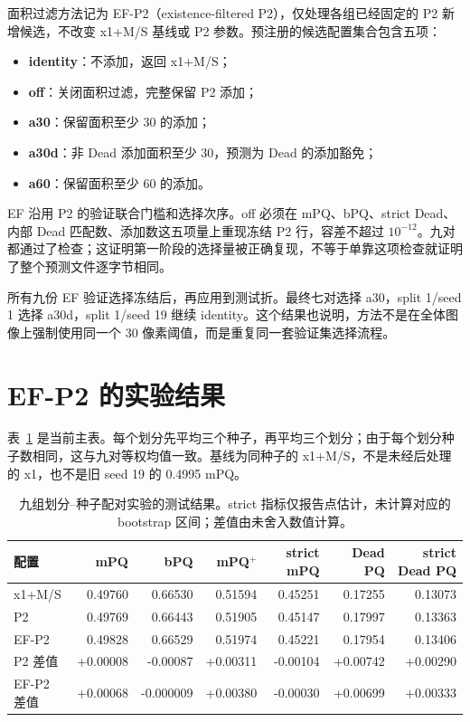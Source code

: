\documentclass[11pt,a4paper,UTF8,fontset=fandol]{ctexart}
\begin{document}
面积过滤方法记为 EF-P2（existence-filtered P2），仅处理各组已经固定的 P2 新增候选，不改变 x1+M/S 基线或 P2 参数。预注册的候选配置集合包含五项\cite{efplan}：
\begin{itemize}
\item \textbf{identity}：不添加，返回 x1+M/S；
\item \textbf{off}：关闭面积过滤，完整保留 P2 添加；
\item \textbf{a30}：保留面积至少 30 的添加；
\item \textbf{a30d}：非 Dead 添加面积至少 30，预测为 Dead 的添加豁免；
\item \textbf{a60}：保留面积至少 60 的添加。
\end{itemize}

EF 沿用 P2 的验证联合门槛和选择次序。off 必须在 mPQ、bPQ、strict Dead、内部 Dead 匹配数、添加数这五项量上重现冻结 P2 行，容差不超过 $10^{-12}$。九对都通过了检查；这证明第一阶段的选择量被正确复现，不等于单靠这项检查就证明了整个预测文件逐字节相同。

所有九份 EF 验证选择冻结后，再应用到测试折。最终七对选择 a30，split 1/seed 1 选择 a30d，split 1/seed 19 继续 identity。这个结果也说明，方法不是在全体图像上强制使用同一个 30 像素阈值，而是重复同一套验证集选择流程。

\section{EF-P2 的实验结果}

表~\ref{tab:main} 是当前主表。每个划分先平均三个种子，再平均三个划分；由于每个划分种子数相同，这与九对等权均值一致。基线为同种子的 x1+M/S，不是未经后处理的 x1，也不是旧 seed 19 的 0.4995 mPQ。

\begin{table}[H]
\centering\footnotesize
\setlength{\tabcolsep}{3pt}
\caption{九组划分--种子配对实验的测试结果。strict 指标仅报告点估计，未计算对应的 bootstrap 区间；差值由未舍入数值计算。}
\label{tab:main}
\begin{tabular}{lrrrrrr}\toprule
配置 & mPQ & bPQ & mPQ$^+$ & strict mPQ & Dead PQ & strict Dead PQ\\\midrule
x1+M/S & 0.49760 & 0.66530 & 0.51594 & 0.45251 & 0.17255 & 0.13073\\
P2 & 0.49769 & 0.66443 & 0.51905 & 0.45147 & 0.17997 & 0.13363\\
EF-P2 & 0.49828 & 0.66529 & 0.51974 & 0.45221 & 0.17954 & 0.13406\\\midrule
P2 差值 & +0.00008 & -0.00087 & +0.00311 & -0.00104 & +0.00742 & +0.00290\\
EF-P2 差值 & +0.00068 & -0.000009 & +0.00380 & -0.00030 & +0.00699 & +0.00333\\\bottomrule
\end{tabular}
\end{table}
\end{document}
